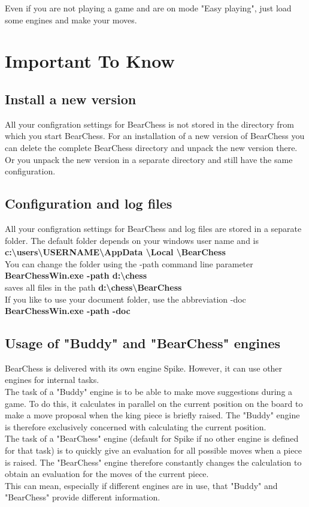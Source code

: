 \documentclass[11pt,a4paper]{article}
\begin{document}
Even if you are not playing a game and are on mode "Easy playing", just load some engines and make your moves.

\section{Important To Know}

\subsection{Install a new version}
All your configration settings for BearChess is not stored in the directory from which you start BearChess. For an installation of a new version of BearChess you can delete the complete BearChess directory and unpack the new version there. Or you unpack the new version in a separate directory and still have the same configuration.

\subsection{Configuration and log files}
All your configration settings for BearChess and log files are stored in a separate folder. The default folder depends on your windows user name and is\\
\textbf{c:\textbackslash users\textbackslash USERNAME\textbackslash AppData \textbackslash Local \textbackslash BearChess}\\
You can change the folder using the -path command line parameter\\
\textbf{BearChessWin.exe -path d:\textbackslash chess} \\ 
saves all files in the path \textbf{d:\textbackslash chess\textbackslash BearChess}\\
If you like to use your document folder, use the abbreviation -doc\\
\textbf{BearChessWin.exe -path -doc} \\ 

\subsection{Usage of "Buddy" and "BearChess" engines} \label{BuddyBearChessEngines}
BearChess is delivered with its own engine Spike. However, it can use other engines for internal tasks.\\
The task of a "Buddy" engine is to be able to make move suggestions during a game. To do this, it calculates in parallel on the current position on the board to make a move proposal when the king piece is briefly raised. The "Buddy" engine is therefore exclusively concerned with calculating the current position.\\
The task of a "BearChess" engine (default for Spike if no other engine is defined for that task) is to quickly give an evaluation for all possible moves when a piece is raised. The "BearChess" engine therefore constantly changes the calculation to obtain an evaluation for the moves of the current piece.\\
This can mean, especially if different engines are in use, that "Buddy" and "BearChess" provide different information. 
\end{document}
